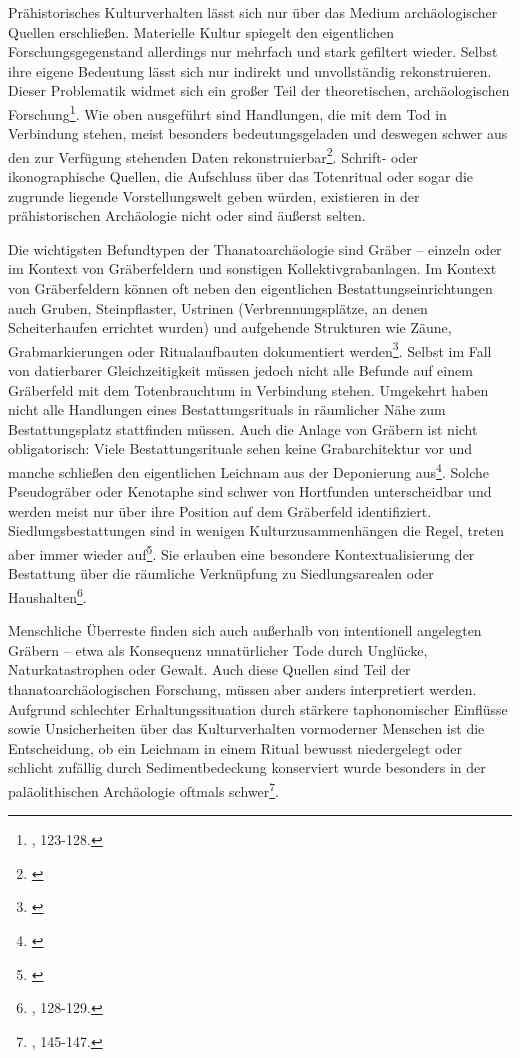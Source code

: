 \documentclass[openany,twoside,twocolumn]{book}
\let\rmarkdownfootnote\footnote%
\def\footnote{\protect\rmarkdownfootnote}
\begin{document}
Prähistorisches Kulturverhalten lässt sich nur über das Medium
archäologischer Quellen erschließen. Materielle Kultur spiegelt den
eigentlichen Forschungsgegenstand allerdings nur mehrfach und stark
gefiltert wieder. Selbst ihre eigene Bedeutung lässt sich nur indirekt
und unvollständig rekonstruieren. Dieser Problematik widmet sich ein
großer Teil der theoretischen, archäologischen Forschung\footnote{\textcite{hofmann_rituelle_2008},
  123-128.}. Wie oben ausgeführt sind Handlungen, die mit dem Tod in
Verbindung stehen, meist besonders bedeutungsgeladen und deswegen schwer
aus den zur Verfügung stehenden Daten rekonstruierbar\footnote{\textcite{harke_nature_1997}}.
Schrift- oder ikonographische Quellen, die Aufschluss über das
Totenritual oder sogar die zugrunde liegende Vorstellungswelt geben
würden, existieren in der prähistorischen Archäologie nicht oder sind
äußerst selten.

Die wichtigsten Befundtypen der Thanatoarchäologie sind Gräber --
einzeln oder im Kontext von Gräberfeldern und sonstigen
Kollektivgrabanlagen. Im Kontext von Gräberfeldern können oft neben den
eigentlichen Bestattungseinrichtungen auch Gruben, Steinpflaster,
Ustrinen (Verbrennungsplätze, an denen Scheiterhaufen errichtet wurden)
und aufgehende Strukturen wie Zäune, Grabmarkierungen oder
Ritualaufbauten dokumentiert werden\footnote{\textcite{fischer_vom_1996}}.
Selbst im Fall von datierbarer Gleichzeitigkeit müssen jedoch nicht alle
Befunde auf einem Gräberfeld mit dem Totenbrauchtum in Verbindung
stehen. Umgekehrt haben nicht alle Handlungen eines Bestattungsrituals
in räumlicher Nähe zum Bestattungsplatz stattfinden müssen. Auch die
Anlage von Gräbern ist nicht obligatorisch: Viele Bestattungsrituale
sehen keine Grabarchitektur vor und manche schließen den eigentlichen
Leichnam aus der Deponierung aus\footnote{\textcite{hausler_zur_1975}}.
Solche Pseudogräber oder Kenotaphe sind schwer von Hortfunden
unterscheidbar und werden meist nur über ihre Position auf dem
Gräberfeld identifiziert. Siedlungsbestattungen sind in wenigen
Kulturzusammenhängen die Regel, treten aber immer wieder auf\footnote{\textcite{veit_studien_1998}}.
Sie erlauben eine besondere Kontextualisierung der Bestattung über die
räumliche Verknüpfung zu Siedlungsarealen oder Haushalten\footnote{\textcite{hofmann_rituelle_2008},
  128-129.}.

Menschliche Überreste finden sich auch außerhalb von intentionell
angelegten Gräbern -- etwa als Konsequenz unnatürlicher Tode durch
Unglücke, Naturkatastrophen oder Gewalt. Auch diese Quellen sind Teil
der thanatoarchäologischen Forschung, müssen aber anders interpretiert
werden. Aufgrund schlechter Erhaltungssituation durch stärkere
taphonomischer Einflüsse sowie Unsicherheiten über das Kulturverhalten
vormoderner Menschen ist die Entscheidung, ob ein Leichnam in einem
Ritual bewusst niedergelegt oder schlicht zufällig durch
Sedimentbedeckung konserviert wurde besonders in der paläolithischen
Archäologie oftmals schwer\footnote{\textcite{hofmann_rituelle_2008},
  145-147.}.
\end{document}
